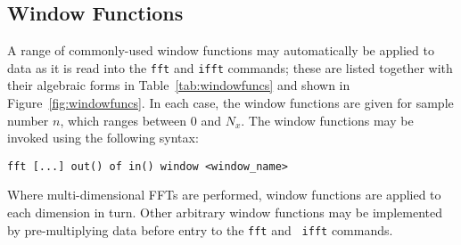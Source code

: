 \subsection{Window Functions}

A range of commonly-used window functions may automatically be applied to data
as it is read into the {\tt fft} and {\tt ifft} commands; these are listed
together with their algebraic forms in Table~\ref{tab:windowfuncs} and shown in
Figure~\ref{fig:windowfuncs}. In each case, the window functions are given for
sample number $n$, which ranges between $0$ and $N_x$. The window functions may
be invoked using the following syntax:

\begin{verbatim}
fft [...] out() of in() window <window_name>
\end{verbatim}

\noindent Where multi-dimensional FFTs are performed, window functions are
applied to each dimension in turn.  Other arbitrary window functions may be
implemented by pre-multiplying data before entry to the {\tt fft} and {\tt
ifft} commands.

